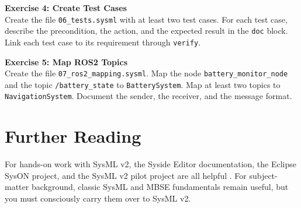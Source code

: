 \begin{uebungbox}
\textbf{Exercise 4: Create Test Cases}\\
Create the file \texttt{06\_tests.sysml} with at least two test cases. For each test case, describe the precondition, the action, and the expected result in the \texttt{doc} block. Link each test case to its requirement through \texttt{verify}.
\end{uebungbox}

\begin{uebungbox}
\textbf{Exercise 5: Map ROS2 Topics}\\
Create the file \texttt{07\_ros2\_mapping.sysml}. Map the node \texttt{battery\_monitor\_node} and the topic \texttt{/battery\_state} to \texttt{BatterySystem}. Map at least two topics to \texttt{NavigationSystem}. Document the sender, the receiver, and the message format.
\end{uebungbox}

\section{Further Reading}
For hands-on work with SysML v2, the Syside Editor documentation, the Eclipse SysON project, and the SysML v2 pilot project are all helpful \cite{syside,syson,sysmlv2pilot}. For subject-matter background, classic SysML and MBSE fundamentals remain useful, but you must consciously carry them over to SysML v2.
